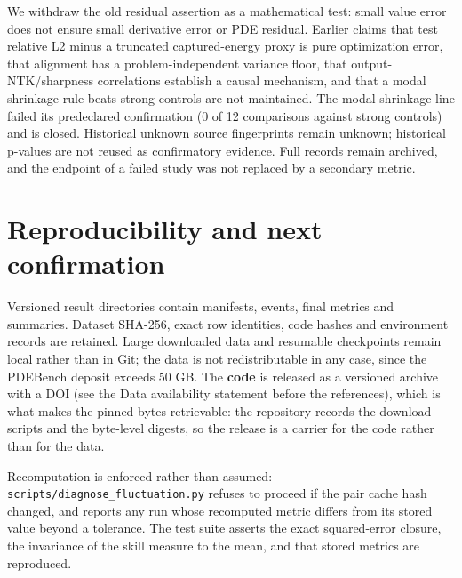 \documentclass[preprint,12pt]{elsarticle}
\begin{document}
We withdraw the old residual assertion as a mathematical test: small value error does not ensure small derivative error or PDE residual. Earlier claims that test relative L2 minus a truncated captured-energy proxy is pure optimization error, that alignment has a problem-independent variance floor, that output-NTK/sharpness correlations establish a causal mechanism, and that a modal shrinkage rule beats strong controls are not maintained. The modal-shrinkage line failed its predeclared confirmation (0 of 12 comparisons against strong controls) and is closed. Historical unknown source fingerprints remain unknown; historical p-values are not reused as confirmatory evidence. Full records remain archived, and the endpoint of a failed study was not replaced by a secondary metric.

\section{Reproducibility and next confirmation}

Versioned result directories contain manifests, events, final metrics and summaries. Dataset SHA-256, exact row identities, code hashes and environment records are retained. Large downloaded data and resumable checkpoints remain local rather than in Git; the data is not redistributable in any case, since the PDEBench deposit exceeds 50 GB. The \textbf{code} is released as a versioned archive with a DOI (see the Data availability statement before the references), which is what makes the pinned bytes retrievable: the repository records the download scripts and the byte-level digests, so the release is a carrier for the code rather than for the data.

Recomputation is enforced rather than assumed: \texttt{scripts/diagnose\_fluctuation.py} refuses to proceed if the pair cache hash changed, and reports any run whose recomputed metric differs from its stored value beyond a tolerance. The test suite asserts the exact squared-error closure, the invariance of the skill measure to the mean, and that stored metrics are reproduced.
\end{document}
